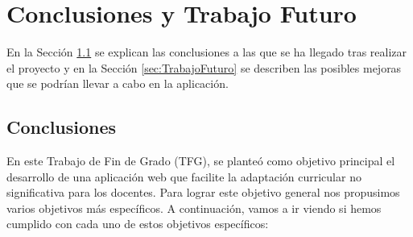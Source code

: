 \chapter{Conclusiones y Trabajo Futuro}
\label{cap:conclusiones}

En la Sección \ref{sec:conclusiones} se explican las conclusiones a las que se ha llegado tras realizar el proyecto y en la Sección \ref{sec:TrabajoFuturo} se describen las posibles mejoras que se podrían llevar a cabo en la aplicación.

\section{Conclusiones}
\label{sec:conclusiones}
En este Trabajo de Fin de Grado (TFG), se planteó como objetivo principal el desarrollo de una aplicación web que facilite la adaptación curricular no significativa para los docentes. Para lograr este objetivo general nos propusimos varios objetivos más específicos. A continuación, vamos a ir viendo si hemos cumplido con cada uno de estos objetivos específicos:

